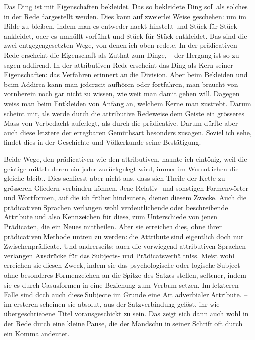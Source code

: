 Das Ding ist mit Eigenschaften bekleidet. Das so bekleidete Ding soll als solches in der Rede dargestellt werden. Dies kann auf zweierlei Weise geschehen: um im Bilde zu bleiben, indem man es entweder nackt hinstellt und Stück für Stück ankleidet, oder es umhüllt vorführt und Stück für Stück entkleidet. Das sind die zwei entgegengesetzten Wege, von denen ich oben redete. In der prädicativen Rede erscheint die Eigenschaft als Zuthat zum Dinge, – der Hergang ist so zu sagen addirend. In der attributiven Rede erscheint das Ding als Kern seiner Eigenschaften: das Verfahren erinnert an die Division. Aber beim Bekleiden und beim Addiren kann man jederzeit aufhören oder fortfahren, man braucht von vornherein noch gar nicht zu wissen, wie weit man damit gehen will. Dagegen weiss man beim Entkleiden von Anfang an, welchem Kerne man zustrebt. Darum scheint mir, als werde durch die attributive Redeweise dem Geiste ein grösseres Mass von Vorbedacht auferlegt, als durch die prädicative. Darum dürfte aber auch diese letztere der erregbaren Gemüthsart besonders zusagen. Soviel ich sehe, findet dies in der Geschichte und Völkerkunde seine Bestätigung.

Beide Wege, den prädicativen wie den attributiven, nannte ich eintönig, weil die geistige  mittels deren ein jeder zurückgelegt wird, immer im Wesentlichen die gleiche bleibt. Dies schliesst aber nicht aus, dass sich \label{sp.455} Theile der Kette zu grösseren Gliedern verbinden können. Jene Relativ- und sonstigen Formenwörter und Wortformen, auf die ich früher hindeutete, dienen diesem Zwecke. Auch die prädicativen Sprachen verlangen wohl verdeutlichende oder beschreibende Attribute und also Kennzeichen für diese, zum Unterschiede von jenen  Prädicaten, die ein Neues mittheilen. Aber sie erreichen dies, ohne ihrer prädicativen Methode untreu zu werden: die Attribute sind eigentlich doch nur Zwischenprädicate. Und andrerseits: auch die vorwiegend attributiven Sprachen verlangen Ausdrücke für das Subjects- und Prädicatsverhältniss. Meist wohl erreichen sie diesen Zweck, indem \label{fp.435} sie das psychologische oder logische Subject ohne besonderes Formenzeichen an die Spitze des Satzes stellen, seltener, indem sie es durch Casusformen in eine Beziehung zum Verbum setzen. Im letzteren Falle sind doch auch diese Subjecte im Grunde eine Art adverbialer Attribute, – im ersteren scheinen sie absolut, aus der Satzverbindung gelöst, ihr wie übergeschriebene Titel vorausgeschickt zu sein. Das zeigt sich dann auch wohl in der Rede durch eine kleine Pause, die der Mandschu in seiner Schrift oft durch ein Komma andeutet.

